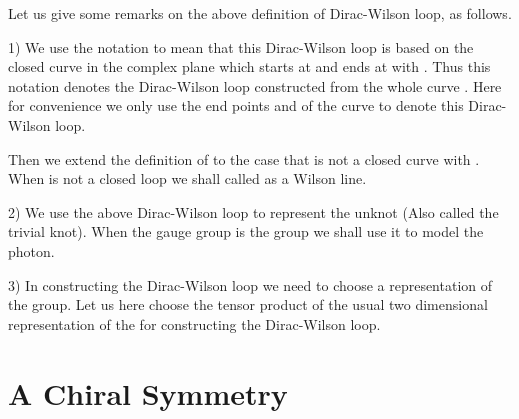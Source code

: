 \documentclass[a4paper,a4paper]{article}
\begin{document}
Let us give some remarks on the above definition
of Dirac-Wilson loop, as follows.

1) We use the notation \coordHE{} to mean that
this Dirac-Wilson loop \coordHE{} is based on the closed curve \coordHE{}
in the complex plane which starts at \coordHE{} and ends
at \coordHE{} with \coordHE{}. Thus this notation \coordHE{} denotes the Dirac-Wilson loop \coordHE{} constructed from the whole curve \coordHE{}. Here for convenience we only use the end points \coordHE{} and
\coordHE{} of the curve \coordHE{} to denote this Dirac-Wilson loop.

Then we  extend the definition of \coordHE{} to the case that \coordHE{} is not a closed curve with \coordHE{}. When \coordHE{} is not a closed loop we shall
called \coordHE{} as a Wilson line.

2) We use the above Dirac-Wilson loop \coordHE{} to represent the unknot (Also called the trivial knot). When the gauge group is the \coordHE{} group we shall use it to model the photon.

3) In constructing the Dirac-Wilson loop we need to choose a representation of the \coordHE{} group. Let us here choose the tensor product of the usual two dimensional representation of the \coordHE{} for constructing the Dirac-Wilson loop. 



\section{A Chiral Symmetry} \label{sec5}
\end{document}
